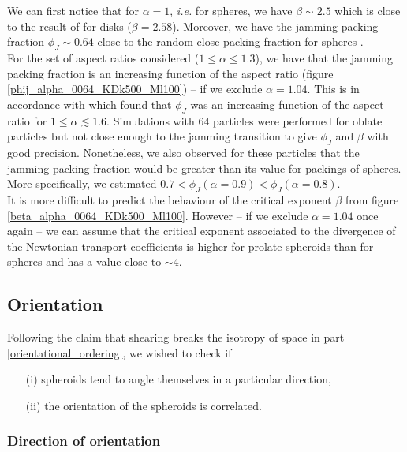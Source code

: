 \documentclass[class=report, float=false, crop=false]{standalone}
\begin{document}
We can first notice that for $\alpha=1$, \textit{i.e.} for spheres, we have $\beta\sim2.5$ which is close to the result of \cite{PRL109.108001} for disks ($\beta=2.58$). Moreover, we have the jamming packing fraction $\phi_J\sim0.64$ close to the random close packing fraction for spheres \cite{donev2004improving}.\\

For the set of aspect ratios considered ($1\le\alpha\le1.3$), we have that the jamming packing fraction is an increasing function of the aspect ratio (figure \ref{phij_alpha_0064_KDk500_Ml100}) -- if we exclude $\alpha=1.04$. This is in accordance with \cite{donev2004improving} which found that $\phi_J$ was an increasing function of the aspect ratio for $1\le\alpha\lesssim1.6$. Simulations with $64$ particles were performed for oblate particles but not close enough to the jamming transition to give $\phi_J$ and $\beta$ with good precision. Nonetheless, we also observed for these particles that the jamming packing fraction would be greater than its value for packings of spheres. More specifically, we estimated $0.7 < \phi_J(\alpha=0.9) < \phi_J(\alpha=0.8)$.\\

It is more difficult to predict the behaviour of the critical exponent $\beta$ from figure \ref{beta_alpha_0064_KDk500_Ml100}. However -- if we exclude $\alpha=1.04$ once again -- we can assume that the critical exponent associated to the divergence of the Newtonian transport coefficients is higher for prolate spheroids than for spheres and has a value close to $\sim 4$.

\subsection{Orientation}
\label{results_orientation}

Following the claim that shearing breaks the isotropy of space in part \ref{orientational_ordering}, we wished to check if
\begin{itemize}
\item[(i)] spheroids tend to angle themselves in a particular direction,
\item[(ii)] the orientation of the spheroids is correlated.
\end{itemize}

\subsubsection{Direction of orientation}
\end{document}
